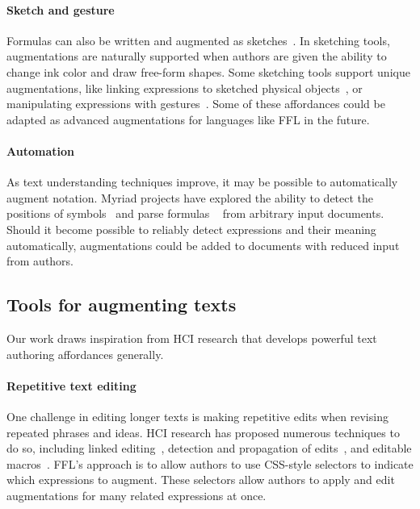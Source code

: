 \paragraph{Sketch and gesture}
Formulas can also be written and augmented as sketches~\cite{ref:laviola2006mathpad2,ref:zeleznik2010hands,ref:leitner2010nice,ref:saquib2021constructing}. In sketching tools, augmentations are naturally supported when authors are given the ability to change ink color and draw free-form shapes. Some sketching tools support unique augmentations, like linking expressions to sketched physical objects~\cite{ref:laviola2006mathpad2,ref:saquib2021constructing}, or manipulating expressions with gestures~\cite{ref:zeleznik2010hands,ref:weitnauer2016graspable,ref:mendes2014structure}. Some of these affordances could be adapted as advanced augmentations for languages like FFL in the future.

\paragraph{Automation}
As text understanding techniques improve, it may be possible to automatically augment notation. Myriad projects have explored the ability to detect the positions of symbols~\cite{ref:head2021augmenting} and parse formulas ~\cite{ref:anthony2005evaluation,ref:ma2021latexify} from arbitrary input documents. Should it become possible to reliably detect expressions and their meaning automatically, augmentations could be added to documents with reduced input from authors.

\subsection{Tools for augmenting texts}
Our work draws inspiration from HCI research that develops powerful text authoring affordances generally.

\paragraph{Repetitive text editing}
One challenge in editing longer texts is making repetitive edits when revising repeated phrases and ideas. HCI research has proposed numerous techniques to do so, including linked editing~\cite{ref:toomim2004managing}, detection and propagation of edits~\cite{ref:miltner2019fly,ref:ni2021recode}, and editable macros~\cite{ref:han2020textlets}. FFL's approach is to allow authors to use CSS-style selectors to indicate which expressions to augment. These selectors allow authors to apply and edit augmentations for many related expressions at once.

